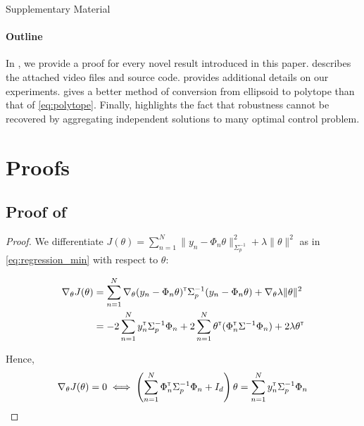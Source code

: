 \documentclass{article}
\begin{document}
\clearpage
\onecolumn
\appendix

\begin{center}
	\LARGE Supplementary Material
\end{center}

\paragraph{Outline}
In , we provide a proof for every novel result introduced in this paper.  describes the attached video files and source code.  provides additional details on our experiments.  gives a better method of conversion from ellipsoid to polytope than that of \eqref{eq:polytope}. Finally,  highlights the fact that robustness cannot be recovered by aggregating independent solutions to many optimal control problem. 

\section{Proofs}
\label{sec:proof}

\subsection{Proof of }

\begin{proof}
We differentiate $J(\theta) = \sum_{n=1}^N \|y_n -\Phi_n\theta\|_{\Sigma_p^{-1}}^2 + \lambda\|\theta\|_{}^2$ as in  \eqref{eq:regression_min} with respect to $\theta$:

\begin{align*}
    \nabla_{\theta} J(\theta) &= \sum_{n=1}^N\nabla_{\theta} (y_n - \Phi_n\theta)^{\mathsf{\scriptscriptstyle T}}\Sigma_p^{-1}(y_n - \Phi_n\theta) + \nabla_{\theta} \lambda\|\theta\|_{}^2\\
    &= -2\sum_{n=1}^N y_n^{\mathsf{\scriptscriptstyle T}}\Sigma_p^{-1}\Phi_n + 2\sum_{n=1}^N\theta^{\mathsf{\scriptscriptstyle T}}(\Phi_n^{\mathsf{\scriptscriptstyle T}}\Sigma^{-1}\Phi_n) +  2 \lambda \theta^{\mathsf{\scriptscriptstyle T}}
\end{align*}

Hence,
\begin{align*}
    \nabla_{\theta} J(\theta) = 0 \iff \left(\sum_{n=1}^N\Phi_n^{\mathsf{\scriptscriptstyle T}}\Sigma_p^{-1}\Phi_n + I_d\right)\theta = \sum_{n=1}^N y_n^{\mathsf{\scriptscriptstyle T}}\Sigma_p^{-1}\Phi_n
\end{align*}
\end{proof}
\end{document}
